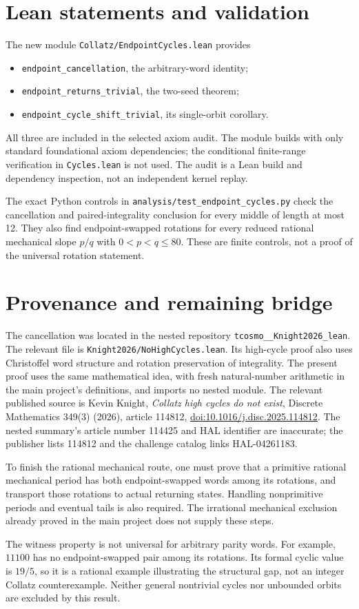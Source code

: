 \documentclass[10pt]{article}
\begin{document}
\section{Lean statements and validation}
The new module \texttt{Collatz/EndpointCycles.lean} provides
\begin{itemize}
\item \texttt{endpoint\_cancellation}, the arbitrary-word identity;
\item \texttt{endpoint\_returns\_trivial}, the two-seed theorem;
\item \texttt{endpoint\_cycle\_shift\_trivial}, its single-orbit corollary.
\end{itemize}
All three are included in the selected axiom audit. The module builds with
only standard foundational axiom dependencies; the conditional finite-range
verification in \texttt{Cycles.lean} is not used. The audit is a Lean build
and dependency inspection, not an independent kernel replay.

The exact Python controls in \texttt{analysis/test\_endpoint\_cycles.py}
check the cancellation and paired-integrality conclusion for every middle
of length at most 12. They also find endpoint-swapped rotations for every
reduced rational mechanical slope $p/q$ with $0<p<q\le80$.
These are finite controls, not a proof of the universal rotation statement.

\section{Provenance and remaining bridge}
The cancellation was located in the nested repository
\texttt{tcosmo\_\_Knight2026\_lean}. The relevant file is
\texttt{Knight2026/NoHighCycles.lean}. Its high-cycle proof also uses
Christoffel word structure and rotation preservation of integrality.
The present proof uses the same mathematical idea, with fresh natural-number
arithmetic in the main project's definitions, and imports no nested module.
The relevant published source is Kevin Knight,
\emph{Collatz high cycles do not exist}, Discrete Mathematics
349(3) (2026), article 114812,
\href{https://doi.org/10.1016/j.disc.2025.114812}{doi:10.1016/j.disc.2025.114812}.
The nested summary's article number 114425 and HAL identifier are inaccurate;
the publisher lists 114812 and the challenge catalog links HAL-04261183.

To finish the rational mechanical route, one must prove that a primitive
rational mechanical period has both endpoint-swapped words among its
rotations, and transport those rotations to actual returning states.
Handling nonprimitive periods and eventual tails is also required.
The irrational mechanical exclusion already proved in the main project does
not supply these steps.

The witness property is not universal for arbitrary parity words. For example,
$11100$ has no endpoint-swapped pair among its rotations. Its formal cyclic
value is $19/5$, so it is a rational example illustrating the structural gap,
not an integer Collatz counterexample. Neither general nontrivial cycles nor
unbounded orbits are excluded by this result.
\end{document}

